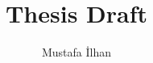 \documentclass[12pt]{report}
\begin{document}
\title{Thesis Draft}
\author{Mustafa İlhan}
\maketitle
{}
\setcounter{secnumdepth}{3}
\setcounter{tocdepth}{3}
\tableofcontents


\end{document}
